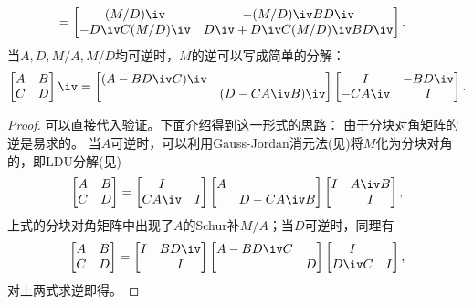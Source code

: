 \begin{theorem}
\begin{subequations}
\begin{align}
			&=\begin{bmatrix}
				(M/D)\iv&-(M/D)\iv BD\iv\\
				-D\iv C(M/D)\iv&D\iv+D\iv C(M/D)\iv BD\iv
			\end{bmatrix}.
		\end{align}
	\end{subequations}
	\tcblower 
	当$A,D,M/A,M/D$均可逆时，$M$的逆可以写成简单的分解：
	\begin{eqnarray}
		\begin{bmatrix}
			A&B\\C&D
		\end{bmatrix}\iv=\begin{bmatrix}
			(A-BD\iv C)\iv\\ &(D-CA\iv B)\iv
		\end{bmatrix}\begin{bmatrix}
			I&-BD\iv\\-CA\iv&I
		\end{bmatrix}.
	\end{eqnarray}
\end{theorem}

\begin{proof}
	可以直接代入验证。下面介绍得到这一形式的思路：
	由于分块对角矩阵的逆是易求的。
	当$A$可逆时，可以利用Gauss-Jordan消元法(见)将$M$化为分块对角的，即LDU分解(见)
	\[
		\begin{bmatrix}
			A&B\\C&D
		\end{bmatrix}=\begin{bmatrix}
			I\\CA\iv&I
		\end{bmatrix}\begin{bmatrix}
			A\\ &D-CA\iv B
		\end{bmatrix}\begin{bmatrix}
			I&A\iv B\\ &I
		\end{bmatrix},
	\]
	上式的分块对角矩阵中出现了$A$的Schur补$M/A$；当$D$可逆时，同理有
	\[
		\begin{bmatrix}
			A&B\\C&D
		\end{bmatrix}=\begin{bmatrix}
			I&BD\iv\\ &I
		\end{bmatrix}\begin{bmatrix}
			A-BD\iv C\\ &D
		\end{bmatrix}\begin{bmatrix}
			I\\D\iv C&I
		\end{bmatrix},
	\]
	对上两式求逆即得。
\end{proof}

